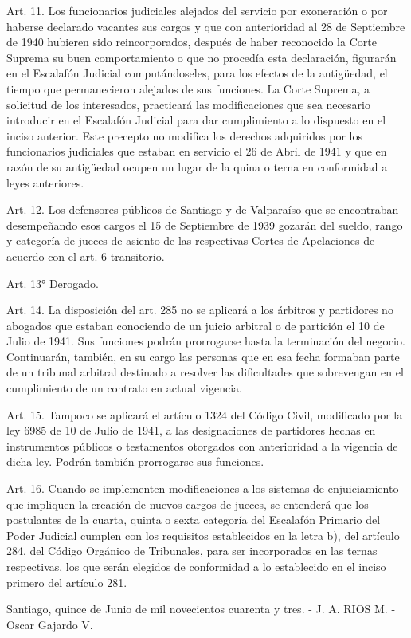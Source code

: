     Art. 11. Los funcionarios judiciales alejados del servicio por exoneración o por haberse declarado vacantes sus cargos y que con anterioridad al 28 de Septiembre de 1940 hubieren sido reincorporados, después de haber reconocido la Corte Suprema su buen comportamiento o que no procedía esta declaración, figurarán en el Escalafón Judicial computándoseles, para los efectos de la antigüedad, el tiempo que permanecieron alejados de sus funciones.
    La Corte Suprema, a solicitud de los interesados, practicará las modificaciones que sea necesario introducir en el Escalafón Judicial para dar cumplimiento a lo dispuesto en el inciso anterior.
    Este precepto no modifica los derechos adquiridos por los funcionarios judiciales que estaban en servicio el 26 de Abril de 1941 y que en razón de su antigüedad ocupen un lugar de la quina o terna en conformidad a leyes anteriores.


    Art. 12. Los defensores públicos de Santiago y de Valparaíso que se encontraban desempeñando esos cargos el 15 de Septiembre de 1939 gozarán del sueldo, rango y categoría de jueces de asiento de las respectivas Cortes de Apelaciones de acuerdo con el art. 6 transitorio.

    Art. 13° Derogado.

    Art. 14. La disposición del art. 285 no se aplicará a los árbitros y partidores no abogados que estaban conociendo de un juicio arbitral o de partición el 10 de Julio de 1941. Sus funciones podrán prorrogarse hasta la terminación del negocio.
    Continuarán, también, en su cargo las personas que en esa fecha formaban parte de un tribunal arbitral destinado a resolver las dificultades que sobrevengan en el cumplimiento de un contrato en actual vigencia.


    Art. 15. Tampoco se aplicará el artículo 1324 del Código Civil, modificado por la ley 6985 de 10 de Julio de 1941, a las designaciones de partidores hechas en instrumentos públicos o testamentos otorgados con anterioridad a la vigencia de dicha ley. Podrán también prorrogarse sus funciones.

    Art. 16. Cuando se implementen modificaciones a los sistemas de enjuiciamiento que impliquen la creación de nuevos cargos de jueces, se entenderá que los postulantes de la cuarta, quinta o sexta categoría del Escalafón Primario del Poder Judicial cumplen con los requisitos establecidos en la letra b), del artículo 284, del Código Orgánico de Tribunales, para ser incorporados en las ternas respectivas, los que serán elegidos de conformidad a lo establecido en el inciso primero del artículo 281.

    Santiago, quince de Junio de mil novecientos cuarenta y tres. - J. A. RIOS M. -Oscar Gajardo V.
